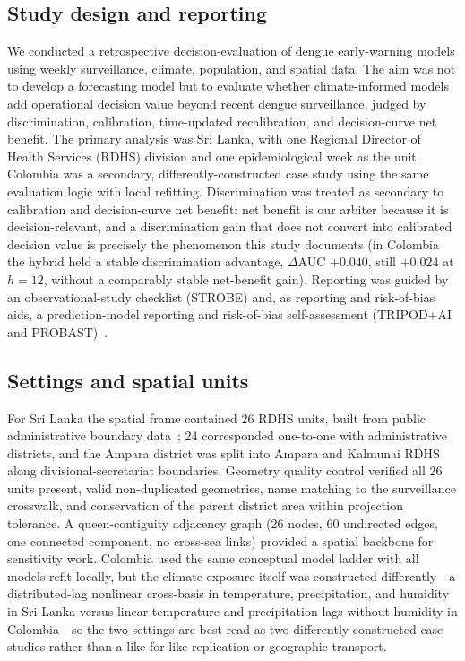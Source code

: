 \documentclass[11pt,a4paper]{article}
\begin{document}
\subsection{Study design and reporting}
We conducted a retrospective decision-evaluation of dengue early-warning models using weekly surveillance, climate, population, and spatial data. The aim was not to develop a forecasting model but to evaluate whether climate-informed models add operational decision value beyond recent dengue surveillance, judged by discrimination, calibration, time-updated recalibration, and decision-curve net benefit. The primary analysis was Sri Lanka, with one Regional Director of Health Services (RDHS) division and one epidemiological week as the unit. Colombia was a secondary, differently-constructed case study using the same evaluation logic with local refitting. Discrimination was treated as secondary to calibration and decision-curve net benefit: net benefit is our arbiter because it is decision-relevant, and a discrimination gain that does not convert into calibrated decision value is precisely the phenomenon this study documents (in Colombia the hybrid held a stable discrimination advantage, $\Delta$AUC $+0.040$, still $+0.024$ at $h=12$, without a comparably stable net-benefit gain). Reporting was guided by an observational-study checklist (STROBE) and, as reporting and risk-of-bias aids, a prediction-model reporting and risk-of-bias self-assessment (TRIPOD+AI and PROBAST)~\cite{vonElm2007,Collins2024TRIPODAI,Wolff2019,Moons2019}.

\subsection{Settings and spatial units}
For Sri Lanka the spatial frame contained 26 RDHS units, built from public administrative boundary data~\cite{HDXCODABSriLanka}; 24 corresponded one-to-one with administrative districts, and the Ampara district was split into Ampara and Kalmunai RDHS along divisional-secretariat boundaries. Geometry quality control verified all 26 units present, valid non-duplicated geometries, name matching to the surveillance crosswalk, and conservation of the parent district area within projection tolerance. A queen-contiguity adjacency graph (26 nodes, 60 undirected edges, one connected component, no cross-sea links) provided a spatial backbone for sensitivity work. Colombia used the same conceptual model ladder with all models refit locally, but the climate exposure itself was constructed differently---a distributed-lag nonlinear cross-basis in temperature, precipitation, and humidity in Sri Lanka versus linear temperature and precipitation lags without humidity in Colombia---so the two settings are best read as two differently-constructed case studies rather than a like-for-like replication or geographic transport.
\end{document}
